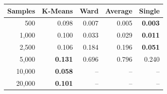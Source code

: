 \begin{tabular}{rrrrr}
\toprule
\textbf{Samples} & \textbf{K-Means} & \textbf{Ward} & \textbf{Average} & \textbf{Single} \\
\midrule
500 & 0.098 & 0.007 & 0.005 & \textbf{0.003} \\
1,000 & 0.100 & 0.033 & 0.029 & \textbf{0.011} \\
2,500 & 0.106 & 0.184 & 0.196 & \textbf{0.051} \\
5,000 & \textbf{0.131} & 0.696 & 0.796 & 0.240 \\
10,000 & \textbf{0.058} & -- & -- & -- \\
20,000 & \textbf{0.101} & -- & -- & -- \\
\bottomrule
\end{tabular}
